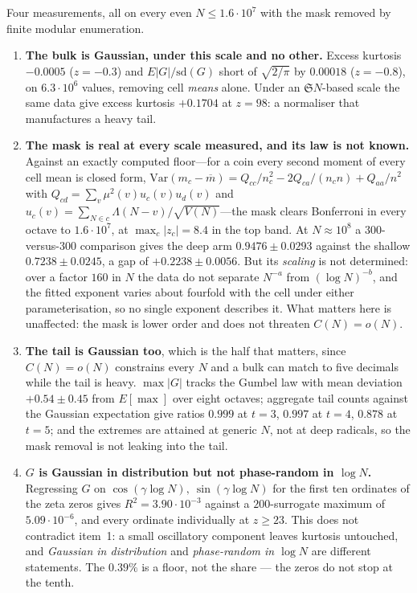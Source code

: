 \documentclass[11pt,a4paper]{article}
\theoremstyle{plain}
\theoremstyle{definition}
\begin{document}
Four measurements, all on every even $N\le1.6\cdot10^7$ with the mask
removed by finite modular enumeration.

\begin{enumerate}
\item \textbf{The bulk is Gaussian, under this scale and no other.}
  Excess kurtosis $-0.0005$ ($z=-0.3$) and
  $E|G|/\mathrm{sd}(G)$ short of $\sqrt{2/\pi}$ by $0.00018$
  ($z=-0.8$), on $6.3\cdot10^6$ values, removing cell \emph{means}
  alone. Under an $\mathfrak S N$-based scale the same data give
  excess kurtosis $+0.1704$ at $z=98$: a normaliser that manufactures a
  heavy tail.

\item \textbf{The mask is real at every scale measured, and its law is
  not known.} Against an exactly computed floor---for a coin every
  second moment of every cell mean is closed form, $\mathrm{Var}(m_c
  -\overline m) = Q_{cc}/n_c^2 - 2Q_{ca}/(n_c n) + Q_{aa}/n^2$ with
  $Q_{cd}=\sum_v\mu^2(v)u_c(v)u_d(v)$ and $u_c(v)=\sum_{N\in c}
  \Lambda(N-v)/\sqrt{V(N)}$---the mask clears Bonferroni in every
  octave to $1.6\cdot10^7$, at $\max_c|z_c| = 8.4$ in the top band. At
  $N\approx10^8$ a $300$-versus-$300$ comparison gives the deep arm
  $0.9476\pm0.0293$ against the shallow $0.7238\pm0.0245$, a gap of
  $+0.2238\pm0.0056$. But its \emph{scaling} is not determined: over a
  factor $160$ in $N$ the data do not separate $N^{-a}$ from
  $(\log N)^{-b}$, and the fitted exponent varies about fourfold with
  the cell under either parameterisation, so no single exponent
  describes it. What matters here is unaffected: the mask is lower
  order and does not threaten $C(N)=o(N)$.

\item \textbf{The tail is Gaussian too}, which is the half that
  matters, since $C(N)=o(N)$ constrains every $N$ and a bulk can match
  to five decimals while the tail is heavy. $\max|G|$ tracks the Gumbel
  law with mean deviation $+0.54\pm0.45$ from $E[\max]$ over eight
  octaves; aggregate tail counts against the Gaussian expectation give
  ratios $0.999$ at $t=3$, $0.997$ at $t=4$, $0.878$ at $t=5$; and the
  extremes are attained at generic $N$, not at deep radicals, so the
  mask removal is not leaking into the tail.

\item \textbf{$G$ is Gaussian in distribution but not phase-random in
  $\log N$.} Regressing $G$ on
  $\cos(\gamma\log N),\ \sin(\gamma\log N)$ for the first ten ordinates
  of the zeta zeros gives $R^2 = 3.90\cdot10^{-3}$ against a
  $200$-surrogate maximum of $5.09\cdot10^{-6}$, and every ordinate
  individually at $z\ge23$. This does not contradict item~1: a small
  oscillatory component leaves kurtosis untouched, and \emph{Gaussian
  in distribution} and \emph{phase-random in $\log N$} are different
  statements. The $0.39\%$ is a floor, not the share --- the zeros do
  not stop at the tenth.
\end{enumerate}
\end{document}
